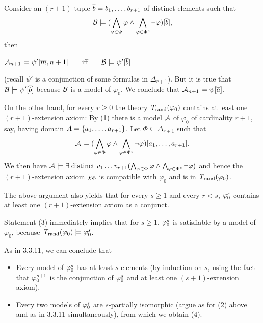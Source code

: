 \begin{enumerate}[1.]
\[\]
Consider an $(r + 1)$-tuple $\overline{b} = b_1, \ldots, b_{r + 1}$ of distinct elements such that
\[
\mathcal{B} \models (\bigwedge_{\varphi \in \Phi} \varphi \land \bigwedge_{\varphi \in \Phi^\mathit{c}} \neg\varphi) [\overline{b}],
\]
then
\begin{center}
$\mathcal{A}_{n + 1} \models \psi' [\overline{m}, n + 1]$ \ \ \ iff \ \ \ $\mathcal{B} \models \psi' [\overline{b}]$
\end{center}
(recall $\psi'$ is a conjunction of some formulas in $\Delta_{r + 1}$). But it is true that $\mathcal{B} \models \psi' [\overline{b}]$ because $\mathcal{B}$ is a model of $\varphi_0$. We conclude that $\mathcal{A}_{n + 1} \models \psi [\overline{a}]$.

On the other hand, for every $r \geq 0$ the theory $\mathit{T}_{\mathrm{rand}}(\varphi_0)$ contains at least one $(r + 1)$-extension axiom: By (1) there is a model $\mathcal{A}$ of $\varphi_0$ of cardinality $r + 1$, say, having domain $A = {\{a_1, \ldots, a_{r + 1}\}}$. Let $\Phi \subseteq \Delta_{r + 1}$ such that
\[
\mathcal{A} \models (\bigwedge_{\varphi \in \Phi} \varphi \land \bigwedge_{\varphi \in \Phi^\mathit{c}} \neg\varphi) [a_1, \ldots, a_{r + 1}].
\]
We then have $\mathcal{A} \models \exists \mathrel{\mathrm{distinct}} v_1 \ldots v_{r + 1} (\bigwedge_{\varphi \in \Phi} \varphi \land \bigwedge_{\varphi \in \Phi^\mathit{c}} \neg\varphi)$ and hence the $(r + 1)$-extension axiom $\extaxm[\Phi]$ is compatible with $\varphi_0$ and is in $\mathit{T}_{\mathrm{rand}}(\varphi_0)$.

The above argument also yields that for every $s \geq 1$ and every $r < s$, $\conjextaxm[\varphi_0]{s}$ contains at least one $(r + 1)$-extension axiom as a conjunct.

Statement (3) immediately implies that for $s \geq 1$, $\conjextaxm[\varphi_0]{s}$ is satisfiable by a model of $\varphi_0$, because $\randstrtheory(\varphi_0) \consq \conjextaxm[\varphi_0]{s}$.

As in 3.3.11, we can conclude that
\begin{itemize}
\item Every model of $\conjextaxm[\varphi_0]{s}$ has at least $s$ elements (by induction on $s$, using the fact that $\conjextaxm[\varphi_0]{s + 1}$ is the conjunction of $\conjextaxm[\varphi_0]{s}$ and at least one $(s + 1)$-extension axiom).
\item Every two models of $\conjextaxm[\varphi_0]{s}$ are $s$-partially isomorphic (argue as for (2) above and as in 3.3.11 simultaneously), from which we obtain (4).
\end{itemize}


\end{enumerate}
